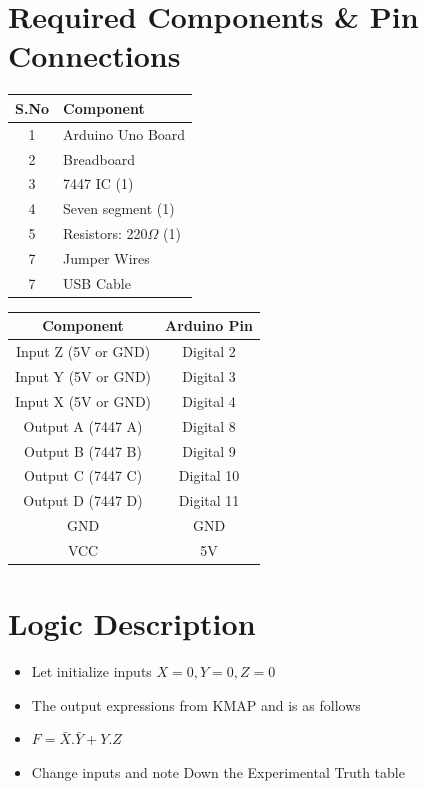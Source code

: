 \documentclass[a4paper,12pt]{article}
\begin{document}
\section*{Required Components \& Pin Connections}
\begin{center}
\begin{minipage}{0.45\textwidth}
\begin{table}[H]
\centering
\begin{tabular}{|c|l|}
\hline
\textbf{S.No} & \textbf{Component} \\ \hline
1 & Arduino Uno Board \\
2 & Breadboard \\
3 & 7447 IC (1) \\
4 & Seven segment (1) \\
5 & Resistors: 220$\Omega$ (1) \\
7 & Jumper Wires \\
7 & USB Cable \\
\hline
\end{tabular}
\end{table}
\end{minipage}
\hspace{0.05\textwidth}
\begin{minipage}{0.45\textwidth}
\begin{table}[H]
\centering
\begin{tabular}{|c|c|}
\hline
\textbf{Component} & \textbf{Arduino Pin} \\ \hline
Input Z (5V or GND) & Digital 2 \\
Input Y (5V or GND) & Digital 3 \\
Input X (5V or GND) & Digital 4 \\
Output A (7447 A) & Digital 8 \\
Output B (7447 B) & Digital 9 \\
Output C (7447 C) & Digital 10 \\
Output D (7447 D) & Digital 11 \\
GND & GND \\
VCC & 5V \\
\hline
\end{tabular}
\end{table}
\end{minipage}
\end{center}
\section*{Logic Description}
\begin{itemize}
        \item Let initialize inputs $X=0,Y=0,Z=0$
        \item The output expressions from KMAP and is as follows
	\item $F=\bar{X}.\bar{Y}+Y.Z$
	\item Change inputs and note Down the Experimental Truth table
\end{itemize}
\end{document}
